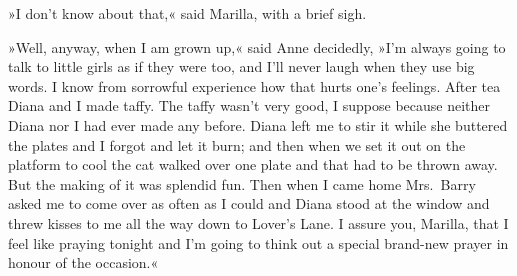 »I don't know about that,« said Marilla, with a brief sigh.

»Well, anyway, when I am grown up,« said Anne decidedly, »I'm always going to talk to little girls as if they were too, and I'll never laugh when they use big words. I know from sorrowful experience how that hurts one's feelings. After tea Diana and I made taffy. The taffy wasn't very good, I suppose because neither Diana nor I had ever made any before. Diana left me to stir it while she buttered the plates and I forgot and let it burn; and then when we set it out on the platform to cool the cat walked over one plate and that had to be thrown away. But the making of it was splendid fun. Then when I came home Mrs.~Barry asked me to come over as often as I could and Diana stood at the window and threw kisses to me all the way down to Lover's Lane. I assure you, Marilla, that I feel like praying tonight and I'm going to think out a special brand-new prayer in honour of the occasion.«